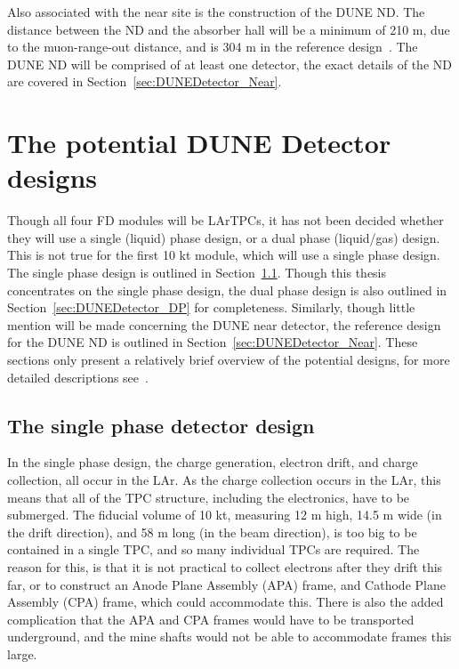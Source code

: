 Also associated with the near site is the construction of the DUNE ND. The distance between the ND and the absorber hall will be a minimum of 210 m, due to the muon-range-out distance, and is 304 m in the reference design~\citep{DUNECDR_V3}. The DUNE ND will be comprised of at least one detector, the exact details of the ND are covered in Section~\ref{sec:DUNEDetector_Near}. \\

\section{The potential DUNE Detector designs} \label{sec:DUNEDetector} %
Though all four FD modules will be LArTPCs, it has not been decided whether they will use a single (liquid) phase design, or a dual phase (liquid/gas) design. This is not true for the first 10 kt module, which will use a single phase design. The single phase design is outlined in Section~\ref{sec:DUNEDetector_SP}. Though this thesis concentrates on the single phase design, the dual phase design is also outlined in Section~\ref{sec:DUNEDetector_DP} for completeness. Similarly, though little mention will be made concerning the DUNE near detector, the reference design for the DUNE ND is outlined in Section~\ref{sec:DUNEDetector_Near}. These sections only present a relatively brief overview of the potential designs, for more detailed descriptions see~\citep{DUNECDR_V4}. \\

\subsection{The single phase detector design} \label{sec:DUNEDetector_SP}
In the single phase design, the charge generation, electron drift, and charge collection, all occur in the LAr. As the charge collection occurs in the LAr, this means that all of the TPC structure, including the electronics, have to be submerged. The fiducial volume of 10 kt, measuring 12 m high, 14.5 m wide (in the drift direction), and 58 m long (in the beam direction), is too big to be contained in a single TPC, and so many individual TPCs are required. The reason for this, is that it is not practical to collect electrons after they drift this far, or to construct an Anode Plane Assembly (APA) frame, and Cathode Plane Assembly (CPA) frame, which could accommodate this. There is also the added complication that the APA and CPA frames would have to be transported underground, and the mine shafts would not be able to accommodate frames this large. \\

